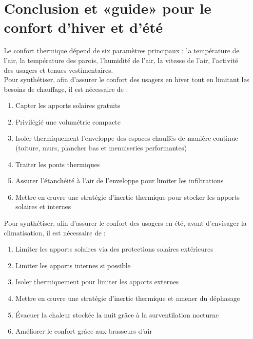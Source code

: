 \chapter{Conclusion et «guide» pour le confort d'hiver et d'été}
Le confort thermique dépend de six paramètres principaux : la température de l'air, la température des parois, l'humidité de l'air, la vitesse de l'air, l'activité des usagers et tenues vestimentaires.\\
Pour synthétiser, afin d'assurer le confort des usagers en hiver tout en limitant les besoins de chauffage, il est nécessaire de :
\begin{enumerate}
    \item Capter les apports solaires gratuits
    \item Privilégié une volumétrie compacte
    \item Isoler thermiquement l'enveloppe des espaces chauffés de manière continue (toiture, murs, plancher bas et menuiseries performantes)
    \item Traiter les ponts thermiques
    \item Assurer l'étanchéité à l'air de l'enveloppe pour limiter les infiltrations
    \item Mettre en œuvre une stratégie d'inertie thermique pour stocker les apports solaires et internes
\end{enumerate}
Pour synthétiser, afin d'assurer le confort des usagers en été, avant d'envisager la climatisation, il est nécessaire de :
\begin{enumerate}
    \item Limiter les apports solaires via des protections solaires extérieures
    \item Limiter les apports internes si possible
    \item Isoler thermiquement pour limiter les apports externes
    \item Mettre en œuvre une stratégie d'inertie thermique et amener du déphasage
    \item Évacuer la chaleur stockée la nuit grâce à la surventilation nocturne
    \item Améliorer le confort grâce aux brasseurs d'air
\end{enumerate}
